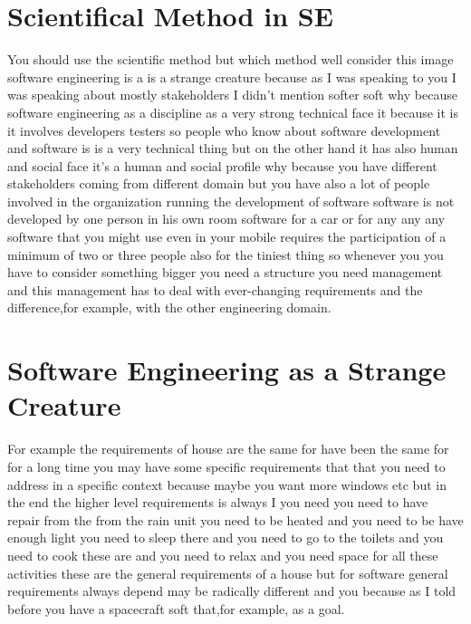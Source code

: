 \documentclass[conference, compsoc, twoside]{IEEEtran}
\begin{document}
 \section{Scientifical Method in SE} %
 \label{sec:scientifical_method_in_se}
 You should use the scientific method but which method well consider this image software engineering is a is a strange creature because as I was speaking to you I was speaking about mostly stakeholders I didn't mention softer soft why because software engineering as a discipline as a very strong technical face it because it is it involves developers testers so people who know about software development and software is is a very technical thing but on the other hand it has also human and social face it's a human and social profile why because you have different stakeholders coming from different domain but you have also a lot of people involved in the organization running the development of software software is not developed by one person in his own room software for a car or for any any any software that you might use even in your mobile requires the participation of a minimum of two or three people also for the tiniest thing so whenever you you have to consider something bigger you need a structure you need management and this management has to deal with ever-changing requirements and the difference,for example, with the other engineering domain.

\section{Software Engineering as a Strange Creature}
For example the requirements of house are the same for have been the same for for a long time you may have some specific requirements that that you need to address in a specific context because maybe you want more windows etc but in the end the higher level requirements is always I you need you need to have repair from the from the rain unit you need to be heated and you need to be have enough light you need to sleep there and you need to go to the toilets and you need to cook these are and you need to relax and you need space for all these activities these are the general requirements of a house but for software general requirements always depend may be radically different and you because as I told before you have a spacecraft soft that,for example, as a goal.
\end{document}
